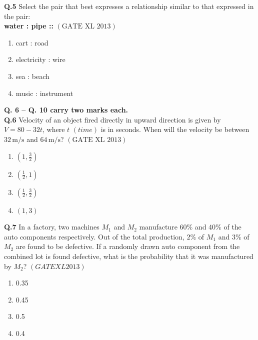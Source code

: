 \documentclass[12pt]{article}
\theoremstyle{remark}
\providecommand{\brak}[1]{\ensuremath{\left(#1\right)}}
\begin{document}
\textbf{Q.5}  
Select the pair that best expresses a relationship similar to that expressed in the pair: \\
\textbf{water : pipe ::} \hfill $\brak{\text{GATE XL 2013}}$
\begin{enumerate}
    \item cart : road
    \item electricity : wire
    \item sea : beach
    \item music : instrument
\end{enumerate}

\noindent\textbf{Q. 6 – Q. 10 carry two marks each.}\\

\textbf{Q.6}  
Velocity of an object fired directly in upward direction is given by $V = 80 - 32t$, where $t$ \brak{time} is in seconds. When will the velocity be between $32\,\mathrm{m/s}$ and $64\,\mathrm{m/s}$? \hfill $\brak{\text{GATE XL 2013}}$
\begin{enumerate}
    \item $\brak{1, \frac{3}{2}}$
    \item $\brak{\frac{1}{2}, 1}$
    \item $\brak{\frac{1}{2}, \frac{3}{2}}$
    \item $\brak{1, 3}$
\end{enumerate}

\textbf{Q.7}  
In a factory, two machines $M_1$ and $M_2$ manufacture $60\%$ and $40\%$ of the auto components respectively. Out of the total production, $2\%$ of $M_1$ and $3\%$ of $M_2$ are found to be defective. If a randomly drawn auto component from the combined lot is found defective, what is the probability that it was manufactured by $M_2$? \hfill \textit\textit{\brak{GATE XL 2013}}
\begin{enumerate}
    \item 0.35
    \item 0.45
    \item 0.5
    \item 0.4
\end{enumerate}
\end{document}
